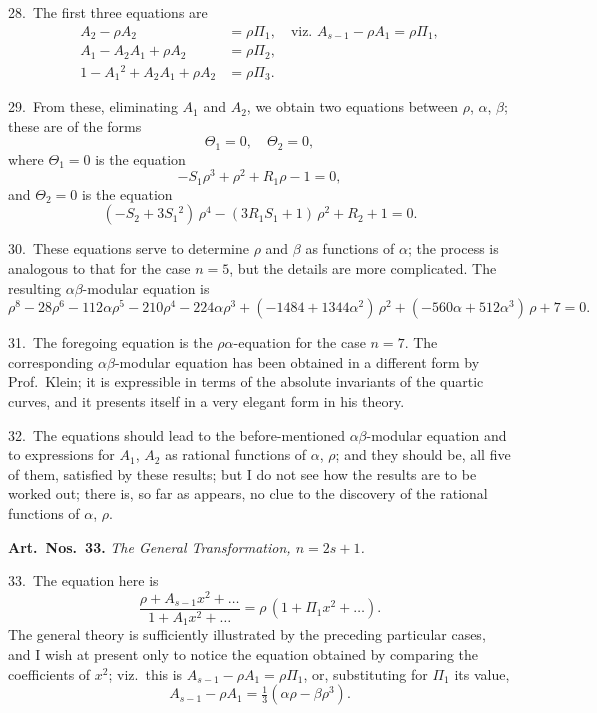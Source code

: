 \documentclass[12pt,a4paper]{article}
\theoremstyle{definition}
\begin{document}
28.\ The first three equations are
\begin{align*}
A_2 - \rho A_2 &= \rho \Pi_1, \quad \text{viz. } A_{s-1} - \rho A_1 = \rho \Pi_1,\\
A_1 - A_2 A_1 + \rho A_2 &= \rho \Pi_2, \\
1 - A_1{}^2 + A_2 A_1 + \rho A_2 &= \rho \Pi_3.
\end{align*}

29.\ From these, eliminating $A_1$ and $A_2$, we obtain two equations between $\rho$, $\alpha$, $\beta$;
these are of the forms
\[
\Theta_1 = 0, \quad \Theta_2 = 0,
\]
where $\Theta_1 = 0$ is the equation
\[
-S_1 \rho^3 + \rho^2 + R_1 \rho - 1 = 0,
\]
and $\Theta_2 = 0$ is the equation
\[
(-S_2 + 3S_1{}^2)\, \rho^4 - (3R_1 S_1 + 1)\, \rho^2 + R_2 + 1 = 0.
\]

30.\ These equations serve to determine $\rho$ and $\beta$ as functions of $\alpha$; the process is
analogous to that for the case $n = 5$, but the details are more complicated. The resulting
$\alpha\beta$-modular equation is
\[
\rho^8 - 28\rho^6 - 112\alpha \rho^5 - 210\rho^4 - 224\alpha \rho^3
+ (-1484 + 1344\alpha^2)\, \rho^2 + (-560\alpha + 512\alpha^3)\, \rho + 7 = 0.
\]

31.\ The foregoing equation is the $\rho\alpha$-equation for the case $n = 7$. The corresponding
$\alpha\beta$-modular equation has been obtained in a different form by Prof.\ Klein; it is
expressible in terms of the absolute invariants of the quartic curves, and it presents
itself in a very elegant form in his theory.

32.\ The equations should lead to the before-mentioned $\alpha\beta$-modular equation
and to expressions for $A_1$, $A_2$ as rational functions of $\alpha$, $\rho$; and they should be, all
five of them, satisfied by these results; but I do not see how the results are to be
worked out; there is, so far as appears, no clue to the discovery of the rational
functions of $\alpha$, $\rho$.

\newpage
\noindent\textbf{Art.\ Nos.\ 33.} \textit{The General Transformation, $n = 2s + 1$.}

33.\ The equation here is
\[
\frac{\rho + A_{s-1} x^2 + \ldots}{1 + A_1 x^2 + \ldots} = \rho\, (1 + \Pi_1 x^2 + \ldots).
\]
The general theory is sufficiently illustrated by the preceding particular cases, and I
wish at present only to notice the equation obtained by comparing the coefficients of
$x^2$; viz.\ this is $A_{s-1} - \rho A_1 = \rho \Pi_1$, or, substituting for $\Pi_1$ its value,
\[
A_{s-1} - \rho A_1 = \tfrac13(\alpha \rho - \beta \rho^3).
\]
\end{document}
